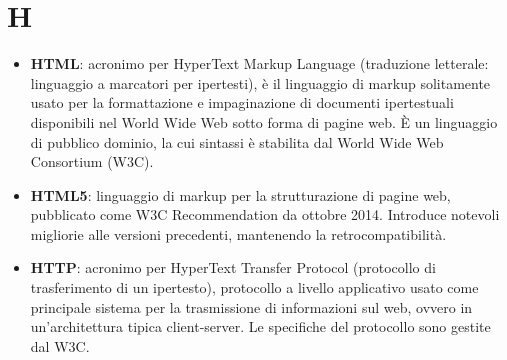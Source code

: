 \section{H}
\begin{itemize} 
	\item \textbf{HTML}: acronimo per HyperText Markup Language (traduzione letterale: linguaggio a marcatori per ipertesti), è il linguaggio di markup solitamente usato per la formattazione e impaginazione di documenti ipertestuali disponibili nel World Wide Web sotto forma di pagine web. È un linguaggio di pubblico dominio, la cui sintassi è stabilita dal World Wide Web Consortium (W3C). 
	\item \textbf{HTML5}: linguaggio di markup per la strutturazione di pagine web, pubblicato come W3C Recommendation da ottobre 2014. Introduce notevoli migliorie alle versioni precedenti, mantenendo la retrocompatibilità.
	\item \textbf{HTTP}: acronimo per HyperText Transfer Protocol (protocollo di trasferimento di un ipertesto), protocollo a livello applicativo usato come principale sistema per la trasmissione di informazioni sul web, ovvero in un'architettura tipica client-server. Le specifiche del protocollo sono gestite dal W3C.
\end{itemize}
